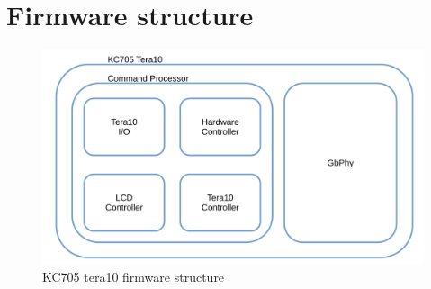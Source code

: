 \section{Firmware structure}
\noindent
\begin{figure}[H]
	\centering
	\includegraphics[width=0.7\linewidth]{IMG/ch4/TERA10}
	\caption{KC705 tera10 firmware structure}
	\label{fig:tera10}
\end{figure}
